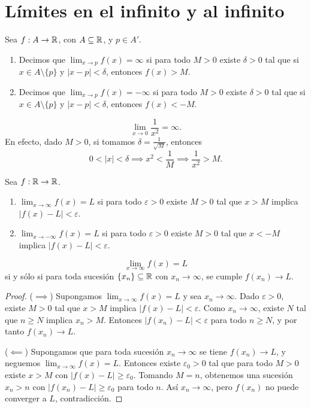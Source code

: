 \section{Límites en el infinito y al infinito}

\begin{definicion}
Sea $f:A\to\mathbb{R}$, con $A\subseteq\mathbb{R}$, y $p\in A'$.
\begin{enumerate}
    \item Decimos que $\lim_{x\to p}f(x)=\infty$ si para todo $M>0$ existe $\delta>0$ tal que si $x\in A\setminus\{p\}$ y $|x-p|<\delta$, entonces $f(x)>M$.
    \item Decimos que $\lim_{x\to p}f(x)=-\infty$ si para todo $M>0$ existe $\delta>0$ tal que si $x\in A\setminus\{p\}$ y $|x-p|<\delta$, entonces $f(x)<-M$.
\end{enumerate}
\end{definicion}

\begin{example}
\[
\lim_{x\to 0}\frac{1}{x^2}=\infty.
\]
En efecto, dado $M>0$, si tomamos $\delta=\frac{1}{\sqrt{M}}$, entonces
\[
0<|x|<\delta \implies x^2<\frac{1}{M} \implies \frac{1}{x^2}>M.
\]
\end{example}

\begin{definicion}
Sea $f:\mathbb{R}\to\mathbb{R}$.
\begin{enumerate}
    \item $\lim_{x\to\infty}f(x)=L$ si para todo $\varepsilon>0$ existe $M>0$ tal que $x>M$ implica $|f(x)-L|<\varepsilon$.
    \item $\lim_{x\to-\infty}f(x)=L$ si para todo $\varepsilon>0$ existe $M>0$ tal que $x<-M$ implica $|f(x)-L|<\varepsilon$.
\end{enumerate}
\end{definicion}

\begin{teorema}
\[
\lim_{x\to\infty}f(x)=L
\]
si y sólo si para toda sucesión $\{x_n\}\subseteq\mathbb{R}$ con $x_n\to\infty$, se cumple $f(x_n)\to L$.
\end{teorema}

\begin{proof}
    ($\implies$) Supongamos $\lim_{x\to\infty}f(x)=L$ y sea $x_n\to\infty$.
    Dado $\varepsilon>0$, existe $M>0$ tal que $x>M$ implica $|f(x)-L|<\varepsilon$.
    Como $x_n\to\infty$, existe $N$ tal que $n\ge N$ implica $x_n>M$.
    Entonces $|f(x_n)-L|<\varepsilon$ para todo $n\ge N$, y por tanto $f(x_n)\to L$.

    ($\impliedby$) Supongamos que para toda sucesión $x_n\to\infty$ se tiene $f(x_n)\to L$, y neguemos $\lim_{x\to\infty}f(x)=L$.
    Entonces existe $\varepsilon_0>0$ tal que para todo $M>0$ existe $x>M$ con $|f(x)-L|\ge\varepsilon_0$.
    Tomando $M=n$, obtenemos una sucesión $x_n>n$ con $|f(x_n)-L|\ge\varepsilon_0$ para todo $n$.
    Así $x_n\to\infty$, pero $f(x_n)$ no puede converger a $L$, contradicción.
\end{proof}

\newpage